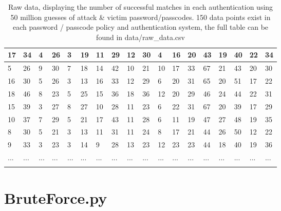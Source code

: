 \documentclass[british,11pt,a4paper]{article}
\begin{document}
\begin{appendices}
\begin{longtable}{|p{0.5cm}|p{0.5cm}|p{0.5cm}|p{0.5cm}|p{0.5cm}|p{0.5cm}|p{0.5cm}|p{0.5cm}|p{0.5cm}|p{0.5cm}|p{0.5cm}|p{0.5cm}|p{0.5cm}|p{0.5cm}|p{0.5cm}|p{0.5cm}|p{0.5cm}|p{0.5cm}|}
	17 & 34 & 4 & 26 & 3 & 19 & 11 & 29 & 12 & 30 & 4 & 16 & 20 & 43 & 19 & 40 & 22 & 34 \\ \hline
	5 & 26 & 9 & 30 & 7 & 18 & 14 & 42 & 10 & 21 & 10 & 17 & 33 & 67 & 21 & 43 & 20 & 30 \\ \hline
	16 & 30 & 5 & 26 & 3 & 13 & 16 & 33 & 12 & 29 & 6 & 20 & 31 & 65 & 20 & 51 & 17 & 22 \\ \hline
	18 & 46 & 8 & 23 & 5 & 25 & 15 & 36 & 18 & 36 & 12 & 20 & 29 & 46 & 24 & 44 & 22 & 31 \\ \hline
	15 & 39 & 3 & 27 & 8 & 27 & 10 & 28 & 11 & 23 & 6 & 22 & 31 & 67 & 20 & 39 & 17 & 29 \\ \hline
	10 & 37 & 7 & 29 & 5 & 21 & 17 & 43 & 11 & 28 & 6 & 11 & 19 & 47 & 27 & 48 & 19 & 35 \\ \hline
	8 & 30 & 5 & 21 & 3 & 13 & 11 & 31 & 11 & 24 & 8 & 17 & 21 & 44 & 26 & 50 & 12 & 22 \\ \hline
	9 & 33 & 3 & 23 & 3 & 14 & 9 & 28 & 13 & 23 & 12 & 23 & 23 & 44 & 18 & 40 & 19 & 36 \\ \hline
	... & ... & ...& ... & ...& ... & ...& ... & ... & ... & ...& ... & ... & ... & ... & ... & ... & ... \\ \hline
		\caption{Raw data, displaying the number of successful matches in each authentication using 50 million guesses of attack \& victim password/passcodes. 150 data points exist in each password / passcode policy and authentication system, the full table can be found in data/raw\_data.csv}
	\label{tab:raw_data}
	\end{longtable}

	\clearpage

	\section{BruteForce.py}\label{app:bruteforce}
	


\end{appendices}
\end{document}
